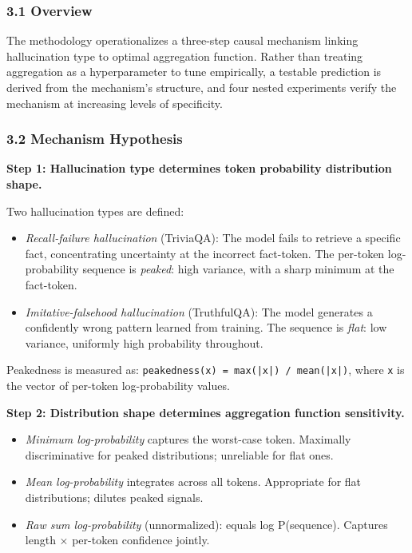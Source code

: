 
\subsubsection{3.1 Overview}

The methodology operationalizes a three-step causal mechanism linking hallucination type to optimal aggregation function. Rather than treating aggregation as a hyperparameter to tune empirically, a testable prediction is derived from the mechanism's structure, and four nested experiments verify the mechanism at increasing levels of specificity.

\subsubsection{3.2 Mechanism Hypothesis}

\textbf{Step 1: Hallucination type determines token probability distribution shape.}

Two hallucination types are defined:

\begin{itemize}
\item \textit{Recall-failure hallucination} (TriviaQA): The model fails to retrieve a specific fact, concentrating uncertainty at the incorrect fact-token. The per-token log-probability sequence is \textit{peaked}: high variance, with a sharp minimum at the fact-token.
\item \textit{Imitative-falsehood hallucination} (TruthfulQA): The model generates a confidently wrong pattern learned from training. The sequence is \textit{flat}: low variance, uniformly high probability throughout.
\end{itemize}

Peakedness is measured as: \texttt{peakedness(x) = max(|x|) / mean(|x|)}, where \texttt{x} is the vector of per-token log-probability values.

\textbf{Step 2: Distribution shape determines aggregation function sensitivity.}

\begin{itemize}
\item \textit{Minimum log-probability} captures the worst-case token. Maximally discriminative for peaked distributions; unreliable for flat ones.
\item \textit{Mean log-probability} integrates across all tokens. Appropriate for flat distributions; dilutes peaked signals.
\item \textit{Raw sum log-probability} (unnormalized): equals log P(sequence). Captures length $\times$ per-token confidence jointly.
\end{itemize}


